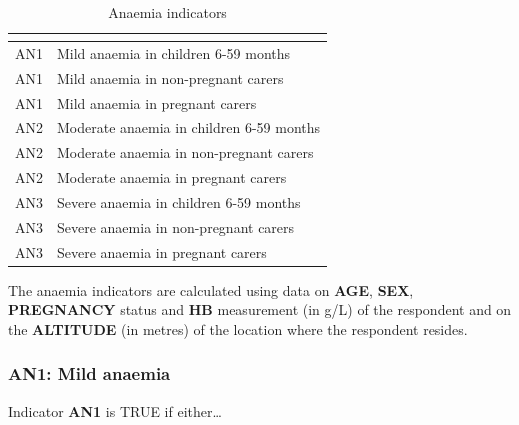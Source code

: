 \documentclass[12pt,a4paper]{article}
\begin{document}
\begin{table}[H]

\caption{\label{tab:anaemia1}Anaemia indicators}
\centering
\begin{tabular}[t]{ll}
\toprule
\textbf{} & \textbf{}\\
\midrule
\rowcolor{gray!6}  AN1 & Mild anaemia in children 6-59 months\\
AN1 & Mild anaemia in non-pregnant carers\\
\rowcolor{gray!6}  AN1 & Mild anaemia in pregnant carers\\
AN2 & Moderate anaemia in children 6-59 months\\
\rowcolor{gray!6}  AN2 & Moderate anaemia in non-pregnant carers\\
\addlinespace
AN2 & Moderate anaemia in pregnant carers\\
\rowcolor{gray!6}  AN3 & Severe anaemia in children 6-59 months\\
AN3 & Severe anaemia in non-pregnant carers\\
\rowcolor{gray!6}  AN3 & Severe anaemia in pregnant carers\\
\bottomrule
\end{tabular}
\end{table}

The anaemia indicators are calculated using data on \textbf{AGE}, \textbf{SEX}, \textbf{PREGNANCY} status and \textbf{HB} measurement (in g/L) of the respondent and on the \textbf{ALTITUDE} (in metres) of the location where the respondent resides.

\hypertarget{an1-mild-anaemia}{%
\subsubsection{AN1: Mild anaemia}\label{an1-mild-anaemia}}

Indicator \textbf{AN1} is TRUE if either\ldots{}
\end{document}
